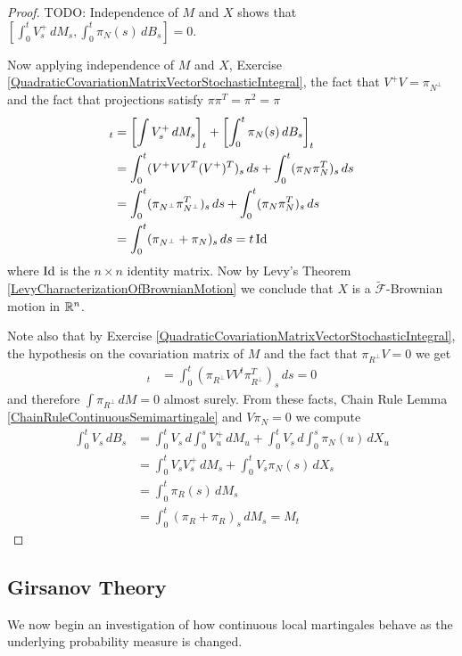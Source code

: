 \begin{proof}
TODO: Independence of $M$ and $X$ shows that $\left[\int_0^t V^+_s \, dM_s, \int_0^t \pi_N(s) \, dB_s \right] = 0$.

Now applying independence of $M$ and $X$, Exercise \ref{QuadraticCovariationMatrixVectorStochasticIntegral}, the fact that $V^+ V = \pi_{N^\perp}$ and the fact that projections satisfy $\pi \pi^T = \pi^2 = \pi$
\begin{align*}
[B]_t &= \left[\int V^+_s \, dM_s\right]_t + \left[ \int_0^t \pi_N(s) \, dB_s \right]_t \\
&=\int_0^t (V^+ V V^T (V^+)^T)_s \, ds + \int_0^t (\pi_N \pi_N^T)_s \, ds \\
&=\int_0^t (\pi_{N^\perp} \pi_{N^\perp}^T)_s \, ds + \int_0^t (\pi_N \pi_N^T)_s \, ds \\
&=\int_0^t (\pi_{N^\perp} + \pi_N)_s \, ds = t \IdentityMatrix\\
\end{align*}
where $\operatorname*{Id}$ is the $n \times n$ identity matrix.  Now by Levy's Theorem \ref{LevyCharacterizationOfBrownianMotion} we conclude that $X$ is a $\tilde{\mathcal{F}}$-Brownian motion in $\mathbb{R}^n$.

Note also that by Exercise \ref{QuadraticCovariationMatrixVectorStochasticIntegral}, the hypothesis on the covariation matrix of $M$ and the fact that $\pi_{R^\perp} V = 0$ we get
\begin{align*}
[\int \pi_{R^\perp} \, dM]_t &= \int_0^t (\pi_{R^\perp} V V^t \pi_{R^\perp}^T)_s \, ds = 0
\end{align*}
and therefore $\int \pi_{R^\perp} \, dM = 0$ almost surely.  From these facts, Chain Rule Lemma \ref{ChainRuleContinuousSemimartingale} and $V \pi_N = 0$ we compute 
\begin{align*}
\int_0^t V_s \, dB_s &= \int_0^t V_s \, d \int_0^s V^+_u \, dM_u + \int_0^t V_s \, d \int_0^s \pi_N(u) \, dX_u \\
&=\int_0^t V_s V^+_s \, dM_s + \int_0^t V_s \pi_N(s) \, dX_s \\
&=\int_0^t \pi_R(s) \, dM_s \\
&= \int_0^t (\pi_R + \pi_R)_s \, dM_s = M_t
\end{align*}
\end{proof}

\subsection{Girsanov Theory}

We now begin an investigation of how continuous local martingales behave as the underlying probability measure is changed.  


